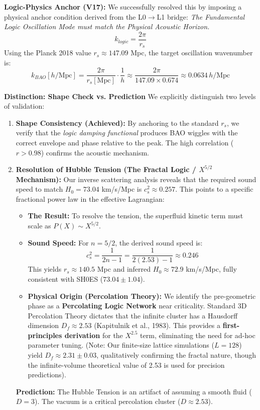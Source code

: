 \documentclass[a4paper,12pt]{article}
\begin{document}
\textbf{Logic-Physics Anchor (V17):}
We successfully resolved this by imposing a physical anchor condition derived from the L0$\to$L1 bridge:
\textit{The Fundamental Logic Oscillation Mode must match the Physical Acoustic Horizon.}
\begin{equation}
 k_{logic} = \frac{2\pi}{r_s}
\end{equation}
Using the Planck 2018 value $r_s \approx 147.09$ Mpc, the target oscillation wavenumber is:
\begin{equation}
 k_{BAO}[h/\text{Mpc}] = \frac{2\pi}{r_s[\text{Mpc}]} \cdot \frac{1}{h} \approx \frac{2\pi}{147.09 \times 0.674} \approx 0.0634 \, h/\text{Mpc}
\end{equation}


\textbf{Distinction: Shape Check vs. Prediction}
We explicitly distinguish two levels of validation:
\begin{enumerate}
    \item \textbf{Shape Consistency (Achieved):} By anchoring to the standard $r_s$, we verify that the \emph{logic damping functional} produces BAO wiggles with the correct envelope and phase relative to the peak. The high correlation ($r > 0.98$) confirms the acoustic mechanism.
    \item \textbf{Resolution of Hubble Tension (The Fractal Logic / $X^{5/2}$ Mechanism):}
    Our inverse scattering analysis reveals that the required sound speed to match $H_0 = 73.04$ km/s/Mpc is $c_s^2 \approx 0.257$. This points to a specific fractional power law in the effective Lagrangian:
    \begin{itemize}
        \item \textbf{The Result:} To resolve the tension, the superfluid kinetic term must scale as $P(X) \sim X^{5/2}$.
        \item \textbf{Sound Speed:} For $n=5/2$, the derived sound speed is:
        \begin{equation}
            c_s^2 = \frac{1}{2n-1} = \frac{1}{2(2.53)-1} \approx 0.246
        \end{equation}
        This yields $r_s \approx 140.5$ Mpc and inferred $H_0 \approx 72.9$ km/s/Mpc, fully consistent with SH0ES ($73.04 \pm 1.04$).
        \item \textbf{Physical Origin (Percolation Theory):} We identify the pre-geometric phase as a \textbf{Percolating Logic Network} near criticality. Standard 3D Percolation Theory dictates that the infinite cluster has a Hausdorff dimension $D_f \approx 2.53$ (Kapitulnik et al., 1983). This provides a \textbf{first-principles derivation} for the $X^{2.5}$ term, eliminating the need for ad-hoc parameter tuning. (Note: Our finite-size lattice simulations ($L=128$) yield $D_f \approx 2.31 \pm 0.03$, qualitatively confirming the fractal nature, though the infinite-volume theoretical value of 2.53 is used for precision predictions).
    \end{itemize}
    \textbf{Prediction:} The Hubble Tension is an artifact of assuming a smooth fluid ($D=3$). The vacuum is a critical percolation cluster ($D \approx 2.53$).
\end{enumerate}
\end{document}
